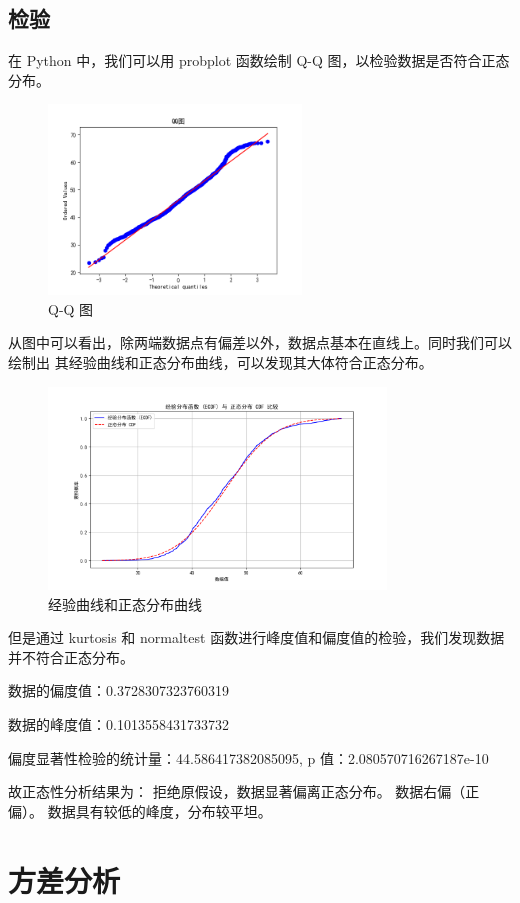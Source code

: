 \documentclass[UTF8,ctexart,a4paper,11pt,openany]{article}
\theoremstyle{definition}
\begin{document}
\subsection{检验}
在 Python 中，我们可以用 probplot 函数绘制 Q-Q 图，以检验数据是否符合正态分布。
\begin{figure}[H]
\centering
\includegraphics[width=0.6\textwidth]{Figure_4.png}
\caption{Q-Q 图}
\label{fig:qq}
\end{figure}
从图中可以看出，除两端数据点有偏差以外，数据点基本在直线上。同时我们可以绘制出
其经验曲线和正态分布曲线，可以发现其大体符合正态分布。
\begin{figure}[H]
\centering
\includegraphics[width=0.8\textwidth]{Figure_5.png}
\caption{经验曲线和正态分布曲线}
\label{fig:ecdf}
\end{figure}
但是通过 kurtosis 和 normaltest 函数进行峰度值和偏度值的检验，我们发现数据并不符合正态分布。\par   
数据的偏度值：0.3728307323760319\par
数据的峰度值：0.1013558431733732\par
偏度显著性检验的统计量：44.586417382085095, p 值：2.080570716267187e-10\par
故正态性分析结果为：
拒绝原假设，数据显著偏离正态分布。
数据右偏（正偏）。
数据具有较低的峰度，分布较平坦。
\section{方差分析}
\end{document}
